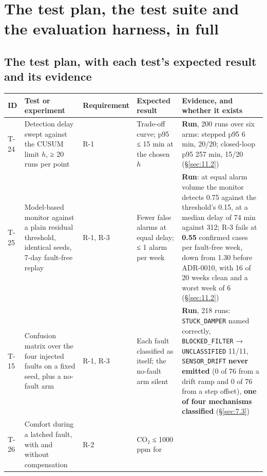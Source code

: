 \section{The test plan, the test suite and the evaluation harness, in full}\label{sec:K}

\subsection{The test plan, with each test's expected result and its evidence}\label{sec:K.1}

\begin{longtable}[]{@{}
  >{\raggedright\arraybackslash}p{}
  >{\raggedright\arraybackslash}p{}
  >{\raggedright\arraybackslash}p{}
  >{\raggedright\arraybackslash}p{}
  >{\raggedright\arraybackslash}p{}@{}}
\toprule
\textbf{ID} & \textbf{Test or experiment} & \textbf{Requirement} & \textbf{Expected result} &
\textbf{Evidence, and whether it exists} \\
\midrule
\endhead
T-24 & Detection delay swept against the CUSUM limit $h$, ≥ 20 runs per point & R-1 &
Trade-off curve; p95 ≤ 15 min at the chosen $h$ & \textbf{Run}, 200 runs over six arms: stepped
p95 6 min, 20/20; closed-loop p95 257 min, 15/20 (§\ref{sec:11.2}) \\
T-25 & Model-based monitor against a plain residual threshold, identical seeds, 7-day fault-free
replay & R-1, R-3 & Fewer false alarms at equal delay; ≤ 1 alarm per week & \textbf{Run}: at equal
alarm volume the monitor detects 0.75 against the threshold's 0.15, at a median delay of 74 min
against 312; R-3 fails at \textbf{0.55} confirmed cases per fault-free week, down from 1.30 before
ADR-0010, with 16 of 20 weeks clean and a worst week of 6 (§\ref{sec:11.2}) \\
T-15 & Confusion matrix over the four injected faults on a fixed seed, plus a no-fault arm &
R-1, R-3 & Each fault classified as itself; the no-fault arm silent & \textbf{Run}, 218 runs:
\texttt{STUCK\_DAMPER} named correctly, \texttt{BLOCKED\_FILTER} → \texttt{UNCLASSIFIED} 11/11,
\texttt{SENSOR\_DRIFT} \textbf{never emitted} (0 of 76 from a drift ramp and 0 of 76 from a step
offset), \textbf{one of four mechanisms classified} (§\ref{sec:7.3}) \\
T-26 & Comfort during a latched fault, with and without compensation & R-2 & CO₂ ≤ 1000 ppm for

\end{longtable}
